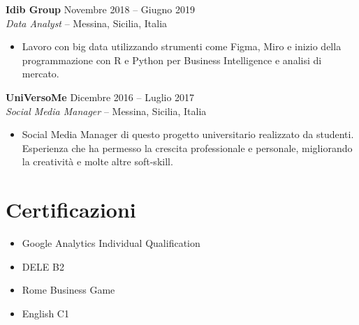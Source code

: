 \documentclass[11pt,a4paper]{article}
\begin{document}
\vspace{4pt}

\textbf{Idib Group} \hfill Novembre 2018 -- Giugno 2019\\
\textit{Data Analyst} -- Messina, Sicilia, Italia
\begin{itemize}[leftmargin=*, nosep]
    \item Lavoro con big data utilizzando strumenti come Figma, Miro e inizio della programmazione con R e Python per Business Intelligence e analisi di mercato.
\end{itemize}

\vspace{4pt}

\textbf{UniVersoMe} \hfill Dicembre 2016 -- Luglio 2017\\
\textit{Social Media Manager} -- Messina, Sicilia, Italia
\begin{itemize}[leftmargin=*, nosep]
    \item Social Media Manager di questo progetto universitario realizzato da studenti. Esperienza che ha permesso la crescita professionale e personale, migliorando la creativit\`{a} e molte altre soft-skill.
\end{itemize}

\section{Certificazioni}
\begin{itemize}[leftmargin=*, nosep]
    \item Google Analytics Individual Qualification
    \item DELE B2
    \item Rome Business Game
    \item English C1
\end{itemize}
\end{document}
